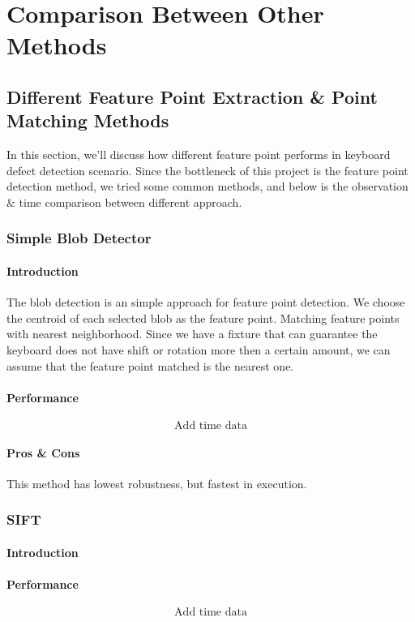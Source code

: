 \chapter{Comparison Between Other Methods}
\label{c:comparision}

\section{Different Feature Point Extraction \& Point Matching Methods}
	In this section, we'll discuss how different feature point performs in keyboard defect detection scenario.
	Since the bottleneck of this project is the feature point detection method, we tried some common methods, and below is the observation \& time comparison between different approach.

	\subsection{Simple Blob Detector}
		\subsubsection{Introduction}
			The blob detection is an simple approach for feature point detection. We choose the centroid of each selected blob as the feature point. Matching feature points with nearest neighborhood. 
			Since we have a fixture that can guarantee the keyboard does not have shift or rotation more then a certain amount, we can assume that the feature point matched is the nearest one.
		\subsubsection{Performance}
			$$\textrm{Add time data}$$
		\subsubsection{Pros \& Cons}
			This method has lowest robustness, but fastest in execution.
	
	\subsection{SIFT}
		\subsubsection{Introduction}
		\subsubsection{Performance}
			$$\textrm{Add time data}$$
